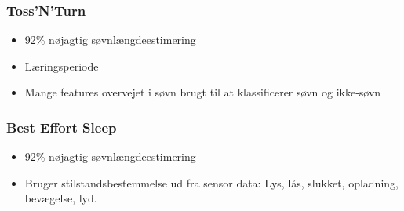 \begin{frame}
\frametitle{Toss'N'Turn}
\begin{itemize}
	\item 92\% nøjagtig søvnlængdeestimering
	\item Læringsperiode
	\item Mange features overvejet i søvn brugt til at klassificerer søvn og ikke-søvn
\end{itemize}
\end{frame}

\begin{frame}
	\frametitle{Best Effort Sleep}
	\begin{itemize}
		\item 92\% nøjagtig søvnlængdeestimering
		\item Bruger stilstandsbestemmelse ud fra sensor data: Lys, lås, slukket, opladning, bevægelse, lyd.
	\end{itemize}
\end{frame}

